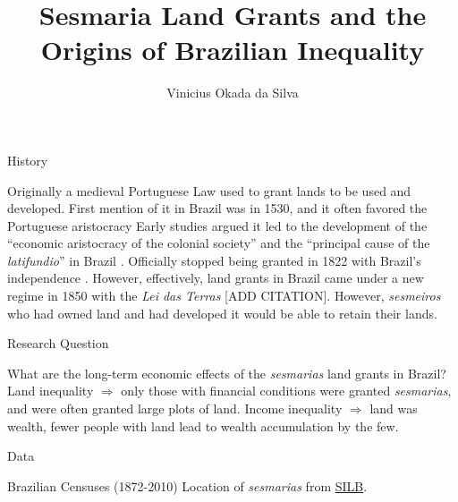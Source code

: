 \documentclass[aspectratio=1610]{beamer}
\title{Sesmaria Land Grants and the Origins of Brazilian Inequality}
\author{Vinicius Okada da Silva}
\institute{The University of Illinois at Urbana-Champaign}
\date{}
\begin{document}
\begin{frame}
	\titlepage
\end{frame}

\begin{frame}{History}
    \begin{outline}
        \1 Originally a medieval Portuguese Law used to grant lands to be used and developed.
        \1 First mention of it in Brazil was in 1530, and it often favored the Portuguese aristocracy \parencite{Lobb1976-mc}
            \2 Early studies argued it led to the development of the ``economic aristocracy of the colonial society'' and the ``principal cause of the \textit{latifundio}'' in Brazil \parencites[p.~36]{Lima2002-kd}[p.~48]{Da_Costa_Porto1979-dz}.
            \2 Officially stopped being granted in 1822 with Brazil's independence \cite{Silva2019-vj}. 
            \2 However, effectively, land grants in Brazil came under a new regime in 1850 with the \textit{Lei das Terras} [ADD CITATION].
            \2 However, \textit{sesmeiros} who had owned land and had developed it would be able to retain their lands. 
    \end{outline}    
\end{frame}

\begin{frame}{Research Question}
    \begin{outline}
        \1 What are the long-term economic effects of the \textit{sesmarias} land grants in Brazil?
            \2 Land inequality $\Rightarrow$ only those with financial conditions were granted \textit{sesmarias}, and were often granted large plots of land.
            \2 Income inequality $\Rightarrow$ land was wealth, fewer people with land lead to wealth accumulation by the few.
    \end{outline}
\end{frame}

\begin{frame}{Data}
    \begin{outline}
        \1 Brazilian Censuses (1872-2010)
        \1 Location of \textit{sesmarias} from \href{http://plataformasilb.cchla.ufrn.br/}{SILB}.
    \end{outline}
\end{frame}
\end{document}
